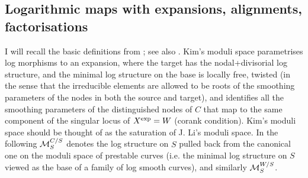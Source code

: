 \subsection{Logarithmic maps with expansions, alignments, factorisations} I will recall the basic definitions from \cite{KimLog,ChenDeg}; see also \cite{OlsCurves,AbramovichMarcusWiseComparison}. Kim's moduli space parametrises log morphisms to an expansion, where the target has the nodal+divisorial log structure, and the minimal log structure on the base is locally free, twisted (in the sense that the irreducible elements are allowed to be roots of the smoothing parameters of the nodes in both the source and target), and identifies all the smoothing parameters of the distinguished nodes of $C$ that map to the same component of the singular locus of $X^{\rm{exp}}=W$ (corank condition). Kim's moduli space should be thought of as the saturation of J. Li's moduli space. In the following $\mathcal M_S^{C/S}$ denotes the log structure on $S$ pulled back from the canonical one on the moduli space of prestable curves (i.e. the minimal log structure on $S$ viewed as the base of a family of log smooth curves), and similarly $\mathcal M_S^{W/S}$.

